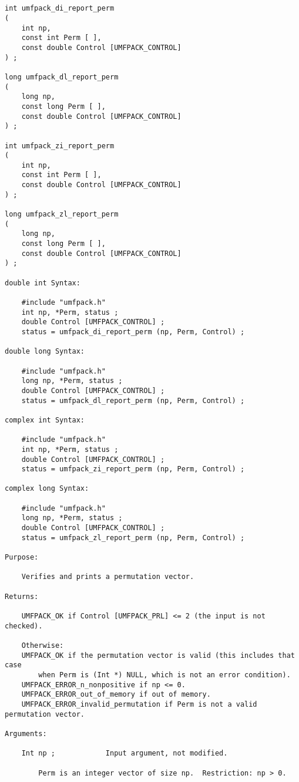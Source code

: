 {\footnotesize
\begin{verbatim}


int umfpack_di_report_perm
(
    int np,
    const int Perm [ ],
    const double Control [UMFPACK_CONTROL]
) ;

long umfpack_dl_report_perm
(
    long np,
    const long Perm [ ],
    const double Control [UMFPACK_CONTROL]
) ;

int umfpack_zi_report_perm
(
    int np,
    const int Perm [ ],
    const double Control [UMFPACK_CONTROL]
) ;

long umfpack_zl_report_perm
(
    long np,
    const long Perm [ ],
    const double Control [UMFPACK_CONTROL]
) ;

double int Syntax:

    #include "umfpack.h"
    int np, *Perm, status ;
    double Control [UMFPACK_CONTROL] ;
    status = umfpack_di_report_perm (np, Perm, Control) ;

double long Syntax:

    #include "umfpack.h"
    long np, *Perm, status ;
    double Control [UMFPACK_CONTROL] ;
    status = umfpack_dl_report_perm (np, Perm, Control) ;

complex int Syntax:

    #include "umfpack.h"
    int np, *Perm, status ;
    double Control [UMFPACK_CONTROL] ;
    status = umfpack_zi_report_perm (np, Perm, Control) ;

complex long Syntax:

    #include "umfpack.h"
    long np, *Perm, status ;
    double Control [UMFPACK_CONTROL] ;
    status = umfpack_zl_report_perm (np, Perm, Control) ;

Purpose:

    Verifies and prints a permutation vector.

Returns:

    UMFPACK_OK if Control [UMFPACK_PRL] <= 2 (the input is not checked).

    Otherwise:
    UMFPACK_OK if the permutation vector is valid (this includes that case
        when Perm is (Int *) NULL, which is not an error condition).
    UMFPACK_ERROR_n_nonpositive if np <= 0.
    UMFPACK_ERROR_out_of_memory if out of memory.
    UMFPACK_ERROR_invalid_permutation if Perm is not a valid permutation vector.

Arguments:

    Int np ;            Input argument, not modified.

        Perm is an integer vector of size np.  Restriction: np > 0.


\end{verbatim}}

